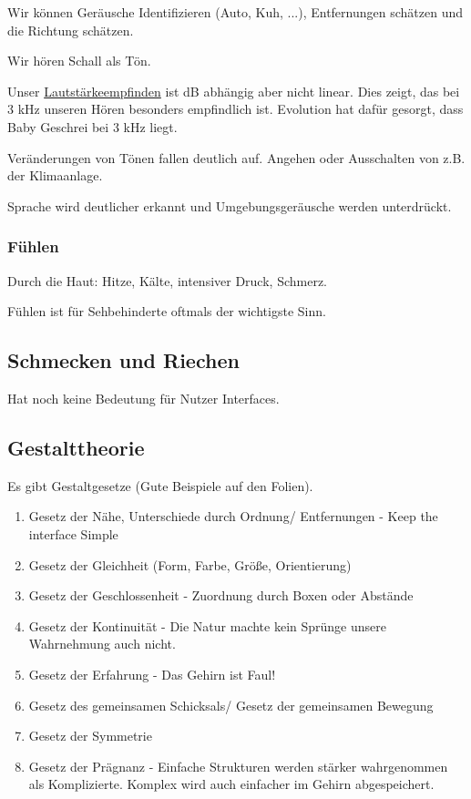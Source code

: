 \documentclass[a4paper]{article}
\begin{document}
Wir können Geräusche Identifizieren (Auto, Kuh, ...), Entfernungen schätzen und die Richtung schätzen.

Wir hören Schall als Tön.

Unser \href{https://de.wikipedia.org/wiki/Lautst%C3%A4rke#/media/Datei:Akustik_db2phon.jpg}{Lautstärkeempfinden} ist dB abhängig aber nicht linear. Dies zeigt, das bei 3 kHz unseren Hören besonders empfindlich ist. Evolution hat dafür gesorgt, dass Baby Geschrei bei 3 kHz liegt.

Veränderungen von Tönen fallen deutlich auf. Angehen oder Ausschalten von z.B. der Klimaanlage.

Sprache wird deutlicher erkannt und Umgebungsgeräusche werden unterdrückt.

\subsubsection{Fühlen}

Durch die Haut: Hitze, Kälte, intensiver Druck, Schmerz.

Fühlen ist für Sehbehinderte oftmals der wichtigste Sinn.

\subsection{Schmecken und Riechen}

Hat noch keine Bedeutung für Nutzer Interfaces.

\subsection{Gestalttheorie}

Es gibt Gestaltgesetze (Gute Beispiele auf den Folien).

\begin{enumerate}
    \item Gesetz der Nähe, Unterschiede durch Ordnung/ Entfernungen - Keep the interface Simple
    \item Gesetz der Gleichheit (Form, Farbe, Größe, Orientierung)
    \item Gesetz der Geschlossenheit - Zuordnung durch Boxen oder Abstände
    \item Gesetz der Kontinuität - Die Natur machte kein Sprünge unsere Wahrnehmung auch nicht.
    \item Gesetz der Erfahrung - Das Gehirn ist Faul!
    \item Gesetz des gemeinsamen Schicksals/ Gesetz der gemeinsamen Bewegung
    \item Gesetz der Symmetrie
    \item Gesetz der Prägnanz - Einfache Strukturen werden stärker wahrgenommen als Komplizierte. Komplex wird auch einfacher im Gehirn abgespeichert.
\end{enumerate}
\end{document}

